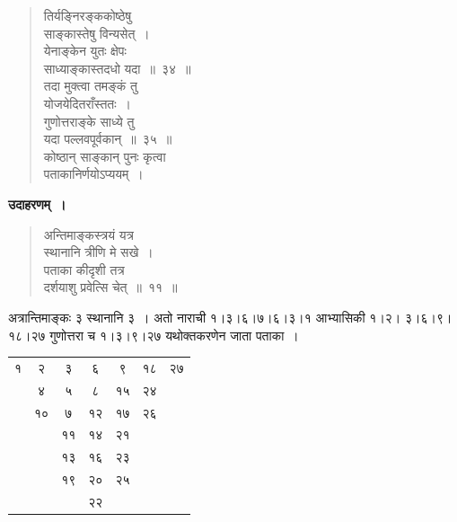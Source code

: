 \documentclass[11pt, openany]{book}
\begin{document}
\newpage

\begin{quote}
{\gk तिर्यङ्निरङ्ककोष्ठेषु\\
साङ्कास्तेषु विन्यसेत्~।\\
येनाङ्केन युतः क्षेपः\\
साध्याङ्कास्तदधो यदा~॥~३४~॥\\
तदा मुक्त्वा तमङ्कं तु\\
योजयेदितराँस्ततः~।\\
गुणोत्तराङ्के साध्ये तु\\
यदा पल्लवपूर्वकान्~॥~३५~॥\\
कोष्ठान् साङ्कान् पुनः कृत्वा\\
पताकानिर्णयोऽप्ययम्~। }
\end{quote}

\textbf{उदाहरणम्~।}

\begin{quote}
{\ex अन्तिमाङ्कस्त्रयं यत्र\\
स्थानानि त्रीणि मे सखे~।\\
पताका कीदृशी तत्र\\
दर्शयाशु प्रवेत्सि चेत्~॥~११~॥~}
\end{quote}

अत्रान्तिमाङ्कः ३ स्थानानि ३~। अतो नाराची १।३।६।७।६।३।१ आभ्यासिकी १।२। ३।६।९।१८।२७ गुणोत्तरा च १।३।९।२७ यथोक्तकरणेन जाता पताका~।

\newpage

\begin{table}[h]
	\centering
	\begin{tabular}{|c|c|c|c|c|c|c|}
		\hline
		{\hbox{१}} & {\hbox{२}} & {\hbox{३}} & {\hbox{६}} & {\hbox{९}} & {\hbox{१८}} & {\hbox{२७}} \\
		\cline{1-7}
		\multicolumn{1}{c|}{} 	&	{\hbox{४}} & {\hbox{५}} & {\hbox{८}} & {\hbox{१५}} & {\hbox{२४}} &  	\multicolumn{1}{c}{}\\
		\cline{2-6}
		\multicolumn{1}{c|}{} 	&	{\hbox{१०}} & {\hbox{७}} & {\hbox{१२}} & {\hbox{१७}} & {\hbox{२६}} &  	\multicolumn{1}{c}{}\\
		\cline{2-6}
		\multicolumn{1}{c}{} 	&\multicolumn{1}{c|}{} & {\hbox{११}} & {\hbox{१४}} & {\hbox{२१}} & \multicolumn{1}{c}{}&  	\multicolumn{1}{c}{}\\
		\cline{3-5}
		\multicolumn{1}{c}{} 	&\multicolumn{1}{c|}{} & {\hbox{१३}} & {\hbox{१६}} & {\hbox{२३}} & \multicolumn{1}{c}{}&  	\multicolumn{1}{c}{}\\
		\cline{3-5}
			\multicolumn{1}{c}{} 	&\multicolumn{1}{c|}{} & {\hbox{१९}} & {\hbox{२०}} & {\hbox{२५}} & \multicolumn{1}{c}{}&  	\multicolumn{1}{c}{}\\
		\cline{3-5}
	\multicolumn{1}{c}{} 	&\multicolumn{1}{c}{} & \multicolumn{1}{c|}{} & {\hbox{२२}} & \multicolumn{1}{c}{} & \multicolumn{1}{c}{}&  	\multicolumn{1}{c}{}\\	
		\cline{4-4}
		\end{tabular}
\end{table}
\vspace{4mm}
\end{document}
